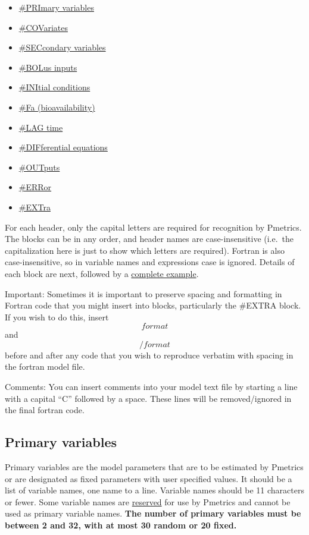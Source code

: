 \documentclass[
]{book}
\providecommand{\tightlist}{%
  \setlength{\itemsep}{0pt}\setlength{\parskip}{0pt}}
\begin{document}
\begin{itemize}
\tightlist
\item
  \protect\hyperlink{pri}{\#PRImary variables}
\item
  \protect\hyperlink{cov}{\#COVariates}
\item
  \protect\hyperlink{sec}{\#SECcondary variables}
\item
  \protect\hyperlink{bol}{\#BOLus inputs}
\item
  \protect\hyperlink{ini}{\#INItial conditions}
\item
  \protect\hyperlink{fa}{\#Fa (bioavailability)}
\item
  \protect\hyperlink{lag}{\#LAG time}
\item
  \protect\hyperlink{dif}{\#DIFferential equations}
\item
  \protect\hyperlink{out}{\#OUTputs}
\item
  \protect\hyperlink{err}{\#ERRor}
\item
  \protect\hyperlink{extra}{\#EXTra}
\end{itemize}

For each header, only the capital letters are required for recognition
by Pmetrics. The blocks can be in any order, and header names are
case-insensitive (i.e.~the capitalization here is just to show which
letters are required). Fortran is also case-insensitive, so in variable
names and expressions case is ignored. Details of each block are next,
followed by a \protect\hyperlink{completeEx}{complete example}.

Important: Sometimes it is important to preserve spacing and formatting in Fortran code that you might insert into blocks, particularly the \#EXTRA block. If you wish to do this, insert \[format\] and \[/format\] before and after any code that you wish to reproduce verbatim with spacing in the fortran model file.

Comments: You can insert comments into your model text file by starting a line with a capital ``C'' followed by a space. These lines will be removed/ignored in the final fortran code.

\hypertarget{pri}{%
\subsection{Primary variables}\label{pri}}

Primary variables are the model parameters that are to be estimated by
Pmetrics or are designated as fixed parameters with user specified
values. It should be a list of variable names, one name to a line.
Variable names should be 11 characters or fewer. Some variable names are \protect\hyperlink{reserved}{reserved} for use by Pmetrics and cannot be used as
primary variable names. \textbf{The number of primary variables must be
between 2 and 32, with at most 30 random or 20 fixed.}
\end{document}
